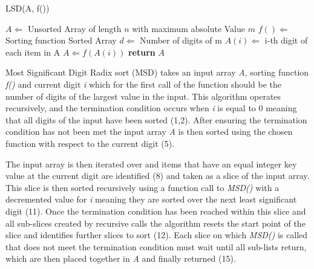 \documentclass[12pt]{article}
\begin{document}
	\begin{algorithm} %
		\caption{LSD({A, f()})} %
		\label{alg3} %
		\begin{algorithmic}[1] %
			\REQUIRE $A \Leftarrow$ Unsorted Array of length $n$ with maximum absolute Value $m$
			\REQUIRE $f() \Leftarrow $Sorting function 
			\ENSURE Sorted Array
			\STATE $d \Leftarrow$ Number of digits of m 
			\STATE $A(i) \Leftarrow$ i-th digit of each item in A
				\STATE $A \Leftarrow f(A(i))$ 
			\ENDFOR
			\STATE \textbf{return} $A$
		\end{algorithmic}
	\end{algorithm}
	\pagebreak
	 \label{sssec:msdradix}
	Most Significant Digit Radix sort (MSD) takes an input array \textit{A}, sorting function \textit{f()} and current digit \textit{i} which for the first call of the function should be the number of digits of the largest value in the input. This algorithm operates recursively, and the termination condition occurs when \textit{i} is equal to 0 meaning that all digits of the input have been sorted (1,2). After ensuring the termination condition has not been met the input array \textit{A} is then sorted using the chosen function with respect to the current digit (5). 
	\par 
	The input array is then iterated over and items that have an equal integer key value at the current digit are identified (8) and taken as a slice of the input array. This slice is then sorted recursively using a function call to \textit{MSD()} with a decremented value for \textit{i} meaning they are sorted over the next least significant digit (11). Once the termination condition has been reached within this slice and all sub-slices created by recursive calls the algorithm resets the start point of the slice and identifies further slices to sort (12). Each slice on which \textit{MSD()} is called that does not meet the termination condition must wait until all sub-lists return, which are then placed together in \textit{A} and finally returned (15).
\end{document}
